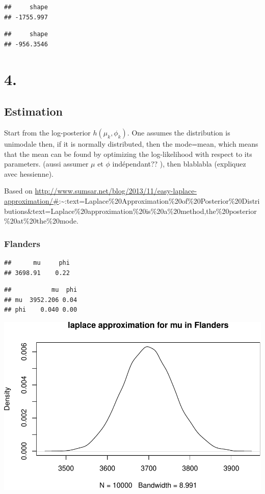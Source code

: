 \documentclass[a4paper, 12pt]{article}
\begin{document}
\begin{verbatim}
##     shape 
## -1755.997
\end{verbatim}

\begin{verbatim}
##     shape 
## -956.3546
\end{verbatim}

    \hypertarget{section}{%
    \section{4.}\label{section}}

    \hypertarget{estimation}{%
    \subsection{Estimation}\label{estimation}}

    Start from the log-posterior \(h(\mu_k, \phi_k)\). One assumes the
    distribution is unimodale then, if it is normally distributed, then
    the mode=mean, which means that the mean can be found by optimizing
    the log-likelihood with respect to its parameters. (aussi assumer
    \(\mu\) et \(\phi\) indépendant?? ), then blablabla (expliquez avec
    hessienne).

    Based on
    \url{http://www.sumsar.net/blog/2013/11/easy-laplace-approximation/\#}:\textasciitilde:text=Laplace\%20Approximation\%20of\%20Posterior\%20Distributions\&text=Laplace\%20approximation\%20is\%20a\%20method,the\%20posterior\%20at\%20the\%20mode.

    \hypertarget{flanders}{%
    \subsubsection{Flanders}\label{flanders}}

\begin{verbatim}
##      mu     phi 
## 3698.91    0.22
\end{verbatim}

\begin{verbatim}
##           mu  phi
## mu  3952.206 0.04
## phi    0.040 0.00
\end{verbatim}

    \begin{center}\includegraphics[width=0.8\linewidth]{resources/figs/unnamed-chunk-7-1} \end{center}
\end{document}
